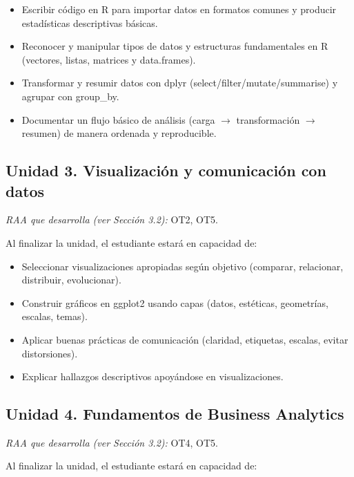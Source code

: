 \documentclass[11pt,a4paper]{article}
\begin{document}
\begin{itemize}
    \item Escribir código en R para importar datos en formatos comunes y producir estadísticas descriptivas básicas.
    \item Reconocer y manipular tipos de datos y estructuras fundamentales en R (vectores, listas, matrices y data.frames).
    \item Transformar y resumir datos con dplyr (select/filter/mutate/summarise) y agrupar con group\_by.
    \item Documentar un flujo básico de análisis (carga $\rightarrow$ transformación $\rightarrow$ resumen) de manera ordenada y reproducible.
\end{itemize}

\subsection*{Unidad 3. Visualización y comunicación con datos}

\textit{RAA que desarrolla (ver Sección 3.2):} OT2, OT5.

Al finalizar la unidad, el estudiante estará en capacidad de:

\begin{itemize}
    \item Seleccionar visualizaciones apropiadas según objetivo (comparar, relacionar, distribuir, evolucionar).
    \item Construir gráficos en ggplot2 usando capas (datos, estéticas, geometrías, escalas, temas).
    \item Aplicar buenas prácticas de comunicación (claridad, etiquetas, escalas, evitar distorsiones).
    \item Explicar hallazgos descriptivos apoyándose en visualizaciones.
\end{itemize}

\subsection*{Unidad 4. Fundamentos de Business Analytics}

\textit{RAA que desarrolla (ver Sección 3.2):} OT4, OT5.

Al finalizar la unidad, el estudiante estará en capacidad de:
\end{document}
